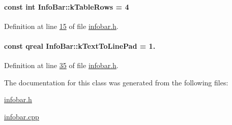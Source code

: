 \paragraph[{k\+Table\+Rows}]{\setlength{\rightskip}{0pt plus 5cm}const int Info\+Bar\+::k\+Table\+Rows = 4\hspace{0.3cm}{\ttfamily [static]}}\label{class_info_bar_ad54d2dd19a63caf9d2476aace60ae3c5}


Definition at line \hyperlink{infobar_8h_source_l00015}{15} of file \hyperlink{infobar_8h_source}{infobar.\+h}.

\hypertarget{class_info_bar_a8455611d11236c2d5cbd42414450e6e2}{}
\paragraph[{k\+Text\+To\+Line\+Pad}]{\setlength{\rightskip}{0pt plus 5cm}const qreal Info\+Bar\+::k\+Text\+To\+Line\+Pad = 1.\hspace{0.3cm}{\ttfamily [static]}}\label{class_info_bar_a8455611d11236c2d5cbd42414450e6e2}


Definition at line \hyperlink{infobar_8h_source_l00035}{35} of file \hyperlink{infobar_8h_source}{infobar.\+h}.



The documentation for this class was generated from the following files\+:\begin{DoxyCompactItemize}
\item 
\hyperlink{infobar_8h}{infobar.\+h}\item 
\hyperlink{infobar_8cpp}{infobar.\+cpp}\end{DoxyCompactItemize}
